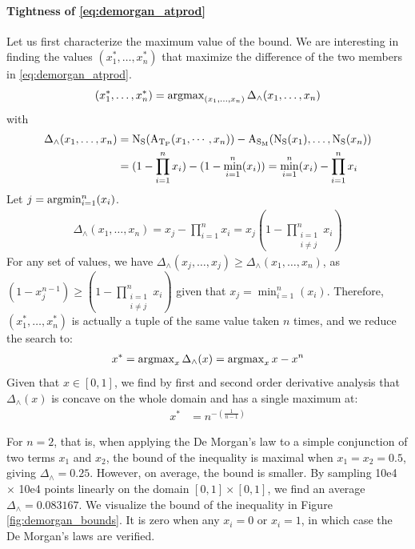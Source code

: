 \paragraph{Tightness of \eqref{eq:demorgan_atprod}}
Let us first characterize the maximum value of the bound.
We are interesting in finding the values $(x_1^*,\dots,x_n^*)$ that maximize the difference of the two members in \eqref{eq:demorgan_atprod}.
\begin{align}
    (x_1^*,\dots,x_n^*) = \operatorname{argmax}_{(x_1,\dots,x_n)}  \Delta_\land(x_1,\dots,x_n)
\end{align}
with
\begin{align}
     \Delta_\land(x_1,\dots,x_n) &= \operatorname{N_{S}}(\operatorname{A_{\operatorname{T_{P}}}}(x_1,\cdots,x_n)) - \operatorname{A_{\operatorname{S_{M}}}}(\operatorname{N_{S}}(x_1),\dots,\operatorname{N_{S}}(x_n)) \\
            &= (1-\prod_{i=1}^{n} x_i) - (1-\min_{i=1}^n(x_i) ) = \min_{i=1}^n(x_i) - \prod_{i=1}^n x_i 
\end{align}
Let $j = \operatorname{argmin}_{i=1}^n (x_i)$.
\begin{align}
    \Delta_\land(x_1,\dots,x_n) = x_j - \prod_{i=1}^n x_i =  x_j (1-\prod_{\substack{i=1\\i\neq j}}^n x_i)
\end{align}
For any set of values, we have $\Delta_\land(x_j,\dots,x_j) \geq \Delta_\land(x_1,\dots,x_n)$, 
as $(1-x_j^{n-1}) \geq (1-\prod_{\substack{i=1\\i\neq j}}^n x_i)$ given that $x_j = \min_{i=1}^n (x_i)$.
Therefore, $(x_1^*,\dots,x_n^*)$ is actually a tuple of the same value taken $n$ times,
and we reduce the search to:
\begin{align}
    x^* = \operatorname{argmax}_{x}  \Delta_\land(x) = \operatorname{argmax}_x x - x^n
\end{align}
Given that $x \in [0,1]$, we find by first and second order derivative analysis that $\Delta_\land(x)$ is concave on the whole domain and has a single maximum at:
\begin{align}
    \label{eq:demorgan_and_max_bound}
    x^* & = n^{-(\frac{1}{n-1})} 
\end{align}

For $n=2$, that is, when applying the De Morgan's law to a simple conjunction of two terms $x_1$ and $x_2$, the bound of the inequality is maximal when $x_1=x_2=0.5$, giving $\Delta_\land = 0.25$.
However, on average, the bound is smaller. 
By sampling 10e4 $\times$ 10e4 points linearly on the domain $[0,1] \times [0,1]$, we find an average $\Delta_\land = 0.083167$. 
We visualize the bound of the inequality in Figure \ref{fig:demorgan_bounds}.
It is zero when any $x_i=0$ or $x_i=1$, in which case the De Morgan's laws are verified.

